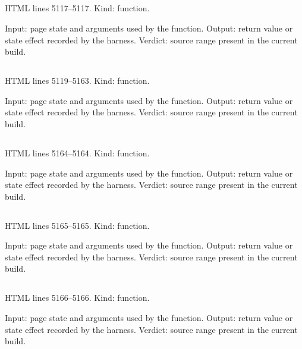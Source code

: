 \subsection*{\texttt{}}
\label{vf_227_fmtTick}
HTML lines 5117--5117. Kind: function.

Input: page state and arguments used by the function.
Output: return value or state effect recorded by the harness.
Verdict: source range present in the current build.

\subsection*{\texttt{}}
\label{vf_228_svgPlot}
HTML lines 5119--5163. Kind: function.

Input: page state and arguments used by the function.
Output: return value or state effect recorded by the harness.
Verdict: source range present in the current build.

\subsection*{\texttt{}}
\label{vf_229_svgMessage}
HTML lines 5164--5164. Kind: function.

Input: page state and arguments used by the function.
Output: return value or state effect recorded by the harness.
Verdict: source range present in the current build.

\subsection*{\texttt{}}
\label{vf_230_extent}
HTML lines 5165--5165. Kind: function.

Input: page state and arguments used by the function.
Output: return value or state effect recorded by the harness.
Verdict: source range present in the current build.

\subsection*{\texttt{}}
\label{vf_231_legendFromMap}
HTML lines 5166--5166. Kind: function.

Input: page state and arguments used by the function.
Output: return value or state effect recorded by the harness.
Verdict: source range present in the current build.

